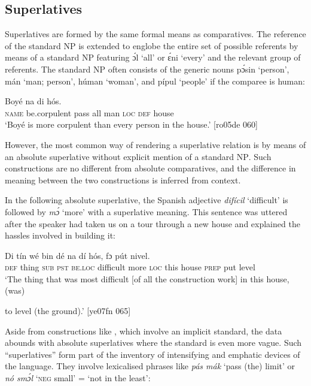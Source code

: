 \subsection{Superlatives}

Superlatives are formed by the same formal means as comparatives. The reference of the standard NP is extended to englobe the entire set of possible referents by means of a standard NP featuring ɔ́l ‘all’ or ɛ́ni ‘every’ and the relevant group of referents. The standard NP often consists of the generic noun{\fff}s pɔ́sin ‘person’, mán ‘man; person’, húman ‘woman’, and pípul ‘people’ if the comparee is human:


\ea%
    \label{ex:key:489}
    \gll Boyé            na  di  hós.\\
\textsc{name}  be.corpulent  pass  all  man    \textsc{loc}  \textsc{def}  house\\

\glt ‘Boyé is more corpulent than every person in the house.’ [ro05de 060]
\z

However, the most common way of rendering a superlative relation is by means of an absolute superlative without explicit mention of a standard \textsc{NP}. Such constructions are no different from absolute comparatives, and the difference in meaning between the two constructions is inferred from context. 


In the following absolute superlative, the Spanish adjective \textit{difícil} ‘difficult’ is followed by \textit{mɔ́} ‘more’ with a superlative meaning. This sentence was uttered after the speaker had taken us on a tour through a new house and explained the hassles involved in building it:



\ea%
    \label{ex:key:490}
    \gll Di  tín    wé  bin  dé          na  dí  hós,    fɔ  pút  nivel.\\
\textsc{def}  thing  \textsc{sub}  \textsc{pst}  \textsc{be.loc}  difficult  more  \textsc{loc}  this  house  \textsc{prep}  put  level\\

\glt ‘The thing that was most difficult [of all the construction work] in this house, (was) 


\glt to level (the ground).’ [ye07fn 065]
\z

Aside from constructions like , which involve an implicit standard, the data abounds with absolute superlatives where the standard is even more vague. Such “superlatives” form part of the inventory of intensifying and emphatic devices of the language. They involve lexicalised phrases like \textit{pás mák} ‘pass (the) limit’ or \textit{nó smɔ́l} ‘\textsc{neg} small’ = ‘not in the least’:


